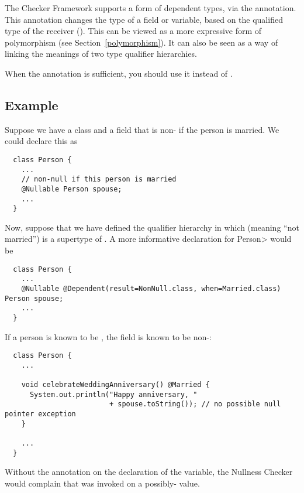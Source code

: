 The Checker Framework supports a form of dependent types, via the
 annotation.
This annotation changes the type of a field or variable, based on the
qualified type of the receiver ().  This can be viewed as a more
expressive form of polymorphism (see Section~\ref{polymorphism}).  It can
also be seen as a way of linking the meanings of two type qualifier
hierarchies.

When the  annotation is sufficient, you
should use it instead of .


\subsection{Example\label{dependent-types-example}}

Suppose we have a class  and a field  that is
non- if the person is married.  We could declare this as

\begin{Verbatim}
  class Person {
    ...
    // non-null if this person is married
    @Nullable Person spouse;
    ...
  }
\end{Verbatim}

Now, suppose that we have defined the qualifier hierarchy in which 
 (meaning ``not married'') is a supertype of .
A more informative declaration for \<Person> would be

\begin{Verbatim}
  class Person {
    ...
    @Nullable @Dependent(result=NonNull.class, when=Married.class) Person spouse;
    ...
  }
\end{Verbatim}

If a person is known to be , the
 field is known to be non-:

\begin{Verbatim}
  class Person {
    ...

    void celebrateWeddingAnniversary() @Married {
      System.out.println("Happy anniversary, "
                         + spouse.toString()); // no possible null pointer exception
    }

    ...
  }
\end{Verbatim}

\noindent
Without the  annotation on the
declaration of the  variable, the Nullness Checker would
complain that  was invoked on a possibly-
value.

